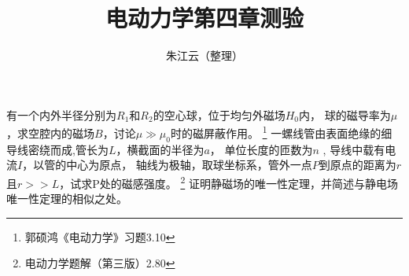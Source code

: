 \documentclass{exam}
\author{朱江云（整理）}
\title{电动力学第四章测验}
\date{}
\begin{document}
\maketitle
\begin{questions}
    \question 有一个内外半径分别为$R_1$和$R_2$的空心球，位于均匀外磁场$H_0$内，
    球的磁导率为$\mu$，求空腔内的磁场$B$，讨论$\mu \gg \mu_0$时的磁屏蔽作用。
    \footnote{郭硕鸿《电动力学》习题3.10}
    \question 一螺线管由表面绝缘的细导线密绕而成,管长为$L$，横截面的半径为$a$，
    单位长度的匝数为$n$ , 导线中载有电流$I$，以管的中心为原点，
    轴线为极轴，取球坐标系，管外一点$P$到原点的距离为$r$且$r>>L$，试求P处的磁感强度。
    \footnote{电动力学题解（第三版）2.80}
    \question 证明静磁场的唯一性定理，并简述与静电场唯一性定理的相似之处。
\end{questions}
\end{document}
